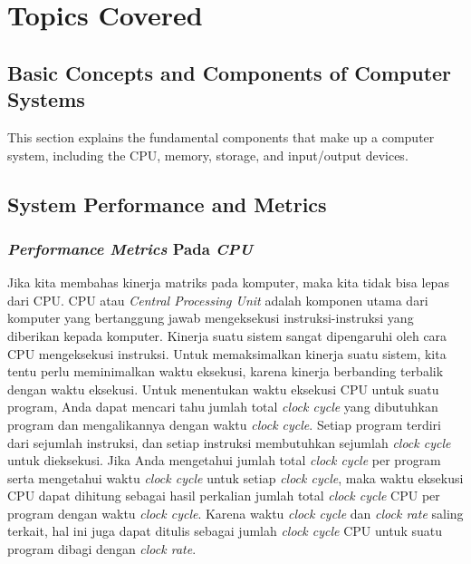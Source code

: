 \documentclass[12pt]{article}
\begin{document}
\section{Topics Covered}

\subsection{Basic Concepts and Components of Computer Systems}
This section explains the fundamental components that make up a computer system, including the CPU, memory, storage, and input/output devices.

\subsection{System Performance and Metrics}
\subsubsection{\textit{Performance Metrics} Pada \textit{CPU}}
\hspace*{1cm} Jika kita membahas kinerja matriks pada komputer, maka kita tidak bisa lepas dari CPU. CPU atau \textit{Central Processing Unit} adalah komponen utama dari komputer yang bertanggung jawab mengeksekusi instruksi-instruksi yang diberikan kepada komputer. Kinerja suatu sistem sangat dipengaruhi oleh cara CPU mengeksekusi instruksi. Untuk memaksimalkan kinerja suatu sistem, kita tentu perlu meminimalkan waktu eksekusi, karena kinerja berbanding terbalik dengan waktu eksekusi.
\newline
\newline
\hspace*{1cm} Untuk menentukan waktu eksekusi CPU untuk suatu program, Anda dapat mencari tahu jumlah total \textit{\textit{clock} cycle} yang dibutuhkan program dan mengalikannya dengan waktu \textit{\textit{clock} cycle}. Setiap program terdiri dari sejumlah instruksi, dan setiap instruksi membutuhkan sejumlah \textit{\textit{clock} cycle} untuk dieksekusi. Jika Anda mengetahui jumlah total \textit{\textit{clock} cycle} per program serta mengetahui waktu \textit{\textit{clock} cycle} untuk setiap \textit{\textit{clock} cycle}, maka waktu eksekusi CPU dapat dihitung sebagai hasil perkalian jumlah total \textit{\textit{clock} cycle} CPU per program dengan waktu \textit{\textit{clock} cycle}. Karena waktu \textit{\textit{clock} cycle} dan \textit{\textit{clock} rate} saling terkait, hal ini juga dapat ditulis sebagai jumlah \textit{\textit{clock} cycle} CPU untuk suatu program dibagi dengan \textit{\textit{clock} rate}.
\end{document}

